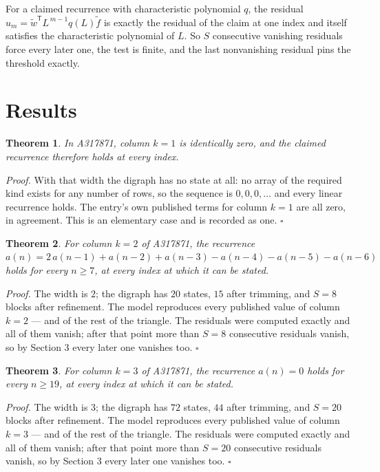 \documentclass[11pt]{article}
\newtheorem{theorem}{Theorem}
\theoremstyle{definition}
\begin{document}
For a claimed recurrence with characteristic polynomial $q$, the residual $u_m = \tilde w^{\mathsf T}L^{\,m-1}q(L)\tilde f$ is exactly the residual of the claim at one index and itself satisfies the characteristic polynomial of $L$. So $S$ consecutive vanishing residuals force every later one, the test is finite, and the last nonvanishing residual pins the threshold exactly.

\section{Results}

\begin{theorem} In A317871, column $k = 1$ is identically zero, and the claimed recurrence therefore holds at every index.\end{theorem}

{\itshape Proof.} With that width the digraph has no state at all: no array of the required kind exists for any number of rows, so the sequence is $0,0,0,\dots$ and every linear recurrence holds. The entry's own published terms for column $k = 1$ are all zero, in agreement. This is an elementary case and is recorded as one. $\square$

\begin{theorem} For column $k = 2$ of A317871, the recurrence $a(n) = 2\,a(n-1) + a(n-2) + a(n-3) - a(n-4) - a(n-5) - a(n-6)$ holds for every $n \ge 7$, at every index at which it can be stated.\end{theorem}

{\itshape Proof.} The width is $2$; the digraph has $20$ states, $15$ after trimming, and $S = 8$ blocks after refinement. The model reproduces every published value of column $k = 2$ --- and of the rest of the triangle. The residuals were computed exactly and all of them vanish; after that point more than $S = 8$ consecutive residuals vanish, so by Section 3 every later one vanishes too. $\square$

\begin{theorem} For column $k = 3$ of A317871, the recurrence $a(n) = 0$ holds for every $n \ge 19$, at every index at which it can be stated.\end{theorem}

{\itshape Proof.} The width is $3$; the digraph has $72$ states, $44$ after trimming, and $S = 20$ blocks after refinement. The model reproduces every published value of column $k = 3$ --- and of the rest of the triangle. The residuals were computed exactly and all of them vanish; after that point more than $S = 20$ consecutive residuals vanish, so by Section 3 every later one vanishes too. $\square$
\end{document}
